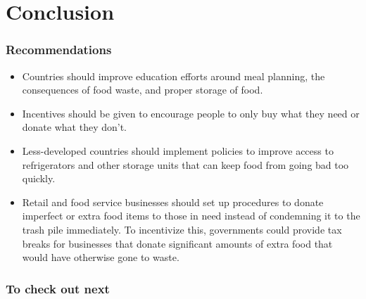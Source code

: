 \documentclass[
]{article}
\providecommand{\tightlist}{%
  \setlength{\itemsep}{0pt}\setlength{\parskip}{0pt}}
\begin{document}
\hypertarget{conclusion}{%
\section{Conclusion 👏}\label{conclusion}}

\hypertarget{recommendations}{%
\subsubsection{Recommendations}\label{recommendations}}

\begin{itemize}
\tightlist
\item
  Countries should improve education efforts around meal planning, the
  consequences of food waste, and proper storage of food.
\item
  Incentives should be given to encourage people to only buy what they
  need or donate what they don't.
\item
  Less-developed countries should implement policies to improve access
  to refrigerators and other storage units that can keep food from going
  bad too quickly.
\item
  Retail and food service businesses should set up procedures to donate
  imperfect or extra food items to those in need instead of condemning
  it to the trash pile immediately. To incentivize this, governments
  could provide tax breaks for businesses that donate significant
  amounts of extra food that would have otherwise gone to waste.
\end{itemize}

\hypertarget{to-check-out-next}{%
\subsubsection{To check out next}\label{to-check-out-next}}
\end{document}
